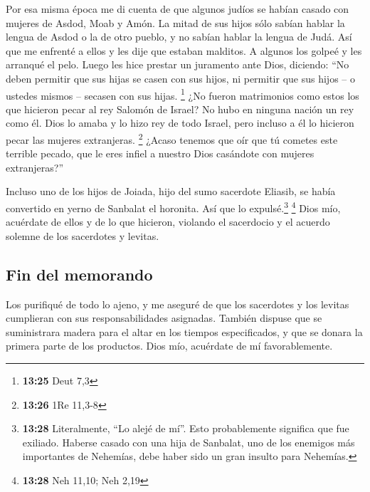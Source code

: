  Por esa misma época me di cuenta de que algunos judíos
se habían casado con mujeres de Asdod, Moab y Amón.  La
mitad de sus hijos sólo sabían hablar la lengua de Asdod o la de otro
pueblo, y no sabían hablar la lengua de Judá.  Así que me
enfrenté a ellos y les dije que estaban malditos. A algunos los golpeé y
les arranqué el pelo. Luego les hice prestar un juramento ante Dios,
diciendo: ``No deben permitir que sus hijas se casen con sus hijos, ni
permitir que sus hijos -- o ustedes mismos -- secasen con sus hijas.
\footnote{\textbf{13:25} Deut 7,3}  ¿No fueron
matrimonios como estos los que hicieron pecar al rey Salomón de Israel?
No hubo en ninguna nación un rey como él. Dios lo amaba y lo hizo rey de
todo Israel, pero incluso a él lo hicieron pecar las mujeres
extranjeras. \footnote{\textbf{13:26} 1Re 11,3-8}  ¿Acaso
tenemos que oír que tú cometes este terrible pecado, que le eres infiel
a nuestro Dios casándote con mujeres extranjeras?''

 Incluso uno de los hijos de Joiada, hijo del sumo
sacerdote Eliasib, se había convertido en yerno de Sanbalat el horonita.
Así que lo expulsé.\footnote{\textbf{13:28} Literalmente, ``Lo alejé de
  mí''. Esto probablemente significa que fue exiliado. Haberse casado
  con una hija de Sanbalat, uno de los enemigos más importantes de
  Nehemías, debe haber sido un gran insulto para Nehemías.} \footnote{\textbf{13:28}
  Neh 11,10; Neh 2,19}  Dios mío, acuérdate de ellos y de
lo que hicieron, violando el sacerdocio y el acuerdo solemne de los
sacerdotes y levitas.

\hypertarget{fin-del-memorando}{%
\subsection{Fin del memorando}\label{fin-del-memorando}}

 Los purifiqué de todo lo ajeno, y me aseguré de que los
sacerdotes y los levitas cumplieran con sus responsabilidades asignadas.
 También dispuse que se suministrara madera para el altar
en los tiempos especificados, y que se donara la primera parte de los
productos. Dios mío, acuérdate de mí favorablemente.
